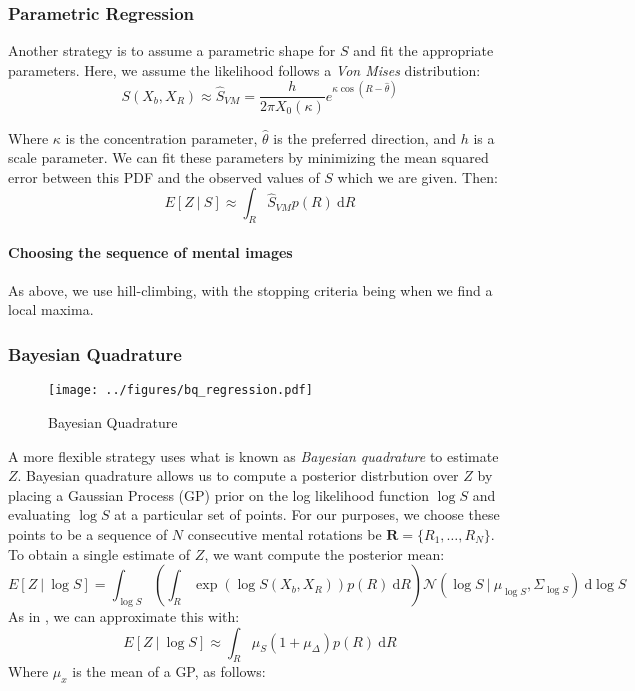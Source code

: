 \documentclass{article} %
\begin{document}
\subsubsection{Parametric Regression}

Another strategy is to assume a parametric shape for $S$ and fit the
appropriate parameters. Here, we assume the likelihood follows a
\emph{Von Mises} distribution:
\begin{equation}
  S(X_b, X_R) \approx \hat{S}_{VM}=\frac{h}{2\pi X_0(\kappa)}e^{\kappa\cos(R-\hat{\theta})}
\end{equation}

Where $\kappa$ is the concentration parameter, $\hat{\theta}$ is the
preferred direction, and $h$ is a scale parameter. We can fit these
parameters by minimizing the mean squared error between this PDF and
the observed values of $S$ which we are given. Then:
\begin{equation}
E[Z\ \vert \ S]\approx \int_R \hat{S}_{VM}p(R)\ \mathrm{d}R
\end{equation}

\paragraph{Choosing the sequence of mental images}

As above, we use hill-climbing, with the stopping criteria being when
we find a local maxima.

\subsubsection{Bayesian Quadrature}

\begin{figure}[t]
  \centering
  \texttt{[image: ../figures/bq\_regression.pdf]}
  \caption{Bayesian Quadrature}
  \label{fig:bq}
\end{figure}

A more flexible strategy uses what is known as \emph{Bayesian
  quadrature} \cite{Diaconis:1988uo,OHagan:1991tx} to estimate $Z$.
Bayesian quadrature allows us to compute a posterior distrbution over
$Z$ by placing a Gaussian Process (GP) \cite{Rasmussen:2006vz} prior
on the log likelihood function $\log S$ and evaluating $\log S$ at a
particular set of points. For our purposes, we choose these points to
be a sequence of $N$ consecutive mental rotations be
$\mathbf{R}=\{R_1, \ldots{}, R_N\}$. To obtain a single estimate of
$Z$, we want compute the posterior mean:
\begin{equation}
  E[Z\ \vert \ \log S]=\int_{\log S}\left(\int_R \exp(\log{S(X_b,X_R)})p(R)\ \mathrm{d}R\right)\mathcal{N}\left(\log{S}\ \vert \ \mu_{\log S}, \Sigma_{\log S}\right)\ \mathrm{d}\log S
\end{equation}
As in \cite{Osborne:2012tm}, we can approximate this with:
\begin{equation}
  E[Z\ \vert \ \log S] \approx \int_R \mu_{S}(1 + \mu_\Delta) p(R)\ \mathrm{d}R
\end{equation} 
Where $\mu_x$ is the mean of a GP, as follows:
\end{document}
